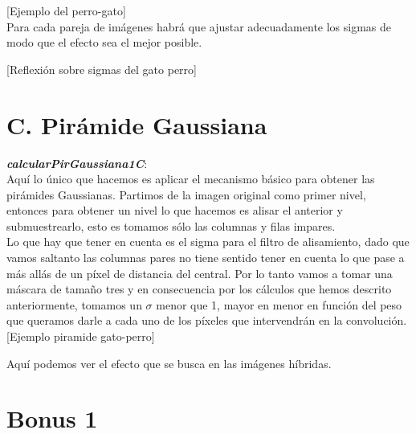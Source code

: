 \documentclass[10pt,a4paper]{article}
\begin{document}
[Ejemplo del perro-gato]\\

Para cada pareja de imágenes habrá que ajustar adecuadamente los sigmas de modo que el efecto sea el mejor posible.

[Reflexión sobre sigmas del gato perro]\\

\section*{C. Pirámide Gaussiana}

\textbf{\textit{calcularPirGaussiana1C}}:\\

Aquí lo único que hacemos es aplicar el mecanismo básico para obtener las pirámides Gaussianas. Partimos de la imagen original como primer nivel, entonces para obtener un nivel lo que hacemos es alisar el anterior y submuestrearlo, esto es tomamos sólo las columnas y filas impares.\\

Lo que hay que tener en cuenta es el sigma para el filtro de alisamiento, dado que vamos saltanto las columnas pares no tiene sentido tener en cuenta lo que pase a más allás de un píxel de distancia del central. Por lo tanto vamos a tomar una máscara de tamaño tres y en consecuencia por los cálculos que hemos descrito anteriormente, tomamos un $\sigma$ menor que 1, mayor en menor en función del peso que queramos darle a cada uno de los píxeles que intervendrán en la convolución.\\

[Ejemplo piramide gato-perro]

Aquí podemos ver el efecto que se busca en las imágenes híbridas.\\

\section*{Bonus 1}
\end{document}

